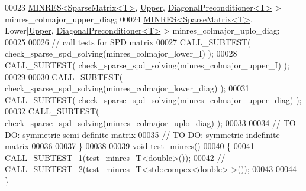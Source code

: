 \begin{DoxyCode}
00023   \hyperlink{group___iterative_linear_solvers___module_class_eigen_1_1_m_i_n_r_e_s}{MINRES<SparseMatrix<T>}, \hyperlink{group__enums_gga39e3366ff5554d731e7dc8bb642f83cda6bcb58be3b8b8ec84859ce0c5ac0aaec}{Upper}, 
      \hyperlink{group___iterative_linear_solvers___module_class_eigen_1_1_diagonal_preconditioner}{DiagonalPreconditioner<T>} > minres\_colmajor\_upper\_diag;
00024   \hyperlink{group___iterative_linear_solvers___module_class_eigen_1_1_m_i_n_r_e_s}{MINRES<SparseMatrix<T>}, Lower|\hyperlink{group__enums_gga39e3366ff5554d731e7dc8bb642f83cda6bcb58be3b8b8ec84859ce0c5ac0aaec}{Upper}, 
      \hyperlink{group___iterative_linear_solvers___module_class_eigen_1_1_diagonal_preconditioner}{DiagonalPreconditioner<T>} > minres\_colmajor\_uplo\_diag;
00025   
00026   \textcolor{comment}{// call tests for SPD matrix}
00027   CALL\_SUBTEST( check\_sparse\_spd\_solving(minres\_colmajor\_lower\_I) );
00028   CALL\_SUBTEST( check\_sparse\_spd\_solving(minres\_colmajor\_upper\_I) );
00029     
00030   CALL\_SUBTEST( check\_sparse\_spd\_solving(minres\_colmajor\_lower\_diag)  );
00031   CALL\_SUBTEST( check\_sparse\_spd\_solving(minres\_colmajor\_upper\_diag)  );
00032   CALL\_SUBTEST( check\_sparse\_spd\_solving(minres\_colmajor\_uplo\_diag)  );
00033     
00034   \textcolor{comment}{// TO DO: symmetric semi-definite matrix}
00035   \textcolor{comment}{// TO DO: symmetric indefinite matrix}
00036 
00037 \}
00038 
00039 \textcolor{keywordtype}{void} test\_minres()
00040 \{
00041   CALL\_SUBTEST\_1(test\_minres\_T<double>());
00042 \textcolor{comment}{//  CALL\_SUBTEST\_2(test\_minres\_T<std::compex<double> >());}
00043 
00044 \}
\end{DoxyCode}
